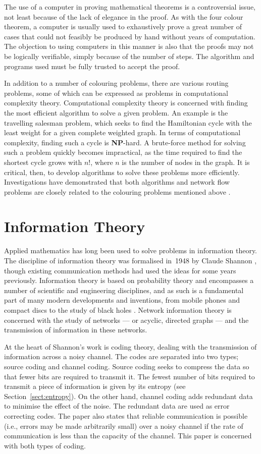 The use of a computer in proving mathematical theorems is a controversial issue, not least because of the lack of elegance in the proof. As with the four colour theorem, a computer is usually used to exhaustively prove a great number of cases that could not feasibly be produced by hand without years of computation. The objection to using computers in this manner is also that the proofs may not be logically verifiable, simply because of the number of steps. The algorithm and programs used must be fully trusted to accept the proof.

In addition to a number of colouring problems, there are various routing problems, some of which can be expressed as problems in computational complexity theory. Computational complexity theory is concerned with finding the most efficient algorithm to solve a given problem. An example is the travelling salesman problem, which seeks to find the Hamiltonian cycle with the least weight for a given complete weighted graph. In terms of computational complexity, finding such a cycle is \textbf{NP}-hard. A brute-force method for solving such a problem quickly becomes impractical, as the time required to find the shortest cycle grows with $n!$, where $n$ is the number of nodes in the graph. It is critical, then, to develop algorithms to solve these problems more efficiently. Investigations have demonstrated that both algorithms and network flow problems are closely related to the colouring problems mentioned above \cite{wils2003}.

\section{Information Theory}

Applied mathematics has long been used to solve problems in information theory. The discipline of information theory was formalised in~1948 by Claude Shannon \cite{shan1948}, though existing communication methods had used the ideas for some years previously. Information theory is based on probability theory and encompasses a number of scientific and engineering disciplines, and as such is a fundamental part of many modern developments and inventions, from mobile phones and compact discs to the study of black holes \cite{beke1973}. Network information theory is concerned with the study of networks --- or acyclic, directed graphs --- and the transmission of information in these networks.

At the heart of Shannon's work is coding theory, dealing with the transmission of information across a noisy channel. The codes are separated into two types; source coding and channel coding. Source coding seeks to compress the data so that fewer bits are required to transmit it. The fewest number of bits required to transmit a piece of information is given by its entropy (see Section~\ref{sect:entropy}). On the other hand, channel coding adds redundant data to minimise the effect of the noise. The redundant data are used as error correcting codes. The paper also states that reliable communication is possible (i.e., errors may be made arbitrarily small) over a noisy channel if the rate of communication is less than the capacity of the channel. This paper is concerned with both types of coding.

